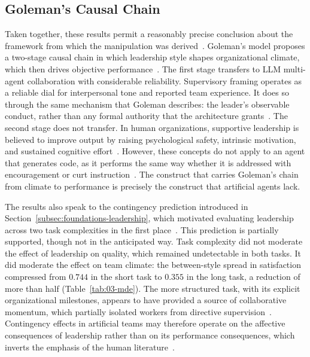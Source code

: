 \subsection{Goleman's Causal Chain}
\label{subsec:goleman-chain-artificial}

Taken together, these results permit a reasonably precise conclusion about the framework from which the manipulation was derived~\cite{goleman2000leadership}.
Goleman's model proposes a two-stage causal chain in which leadership style shapes organizational climate, which then drives objective performance~\cite{goleman2000leadership}.
The first stage transfers to \ac{LLM} multi-agent collaboration with considerable reliability.
Supervisory framing operates as a reliable dial for interpersonal tone and reported team experience.
It does so through the same mechanism that Goleman describes: the leader's observable conduct, rather than any formal authority that the architecture grants~\cite{goleman2000leadership}.
The second stage does not transfer.
In human organizations, supportive leadership is believed to improve output by raising psychological safety, intrinsic motivation, and sustained cognitive effort~\cite{goleman2000leadership, wageman2005teamdiagnosticsurvey, mathieu2017teamwork}.
However, these concepts do not apply to an agent that generates code, as it performs the same way whether it is addressed with encouragement or curt instruction~\cite{kwak2026leadershipcoordinationcontrolbehavioral}.
The construct that carries Goleman's chain from climate to performance is precisely the construct that artificial agents lack.

The results also speak to the contingency prediction introduced in Section~\ref{subsec:foundations-leadership}, which motivated evaluating leadership across two task complexities in the first place~\cite{ayman1995contingency, kwak2026leadershipcoordinationcontrolbehavioral}.
This prediction is partially supported, though not in the anticipated way.
Task complexity did not moderate the effect of leadership on quality, which remained undetectable in both tasks.
It did moderate the effect on team climate: the between-style spread in satisfaction compressed from $0.744$ in the short task to $0.355$ in the long task, a reduction of more than half (Table~\ref{tab:03-mde}).
The more structured task, with its explicit organizational milestones, appears to have provided a source of collaborative momentum, which partially isolated workers from directive supervision~\cite{wageman2005teamdiagnosticsurvey, kwak2026leadershipcoordinationcontrolbehavioral}.
Contingency effects in artificial teams may therefore operate on the affective consequences of leadership rather than on its performance consequences, which inverts the emphasis of the human literature~\cite{ayman1995contingency}.

